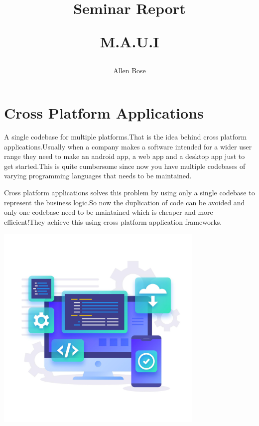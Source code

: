 \documentclass[14pt]{extarticle}
\title{
     \huge Seminar Report \par
     \Huge M.A.U.I
}
\author{
    Allen Bose
}
\begin{document}
\maketitle
{}

\newpage
\tableofcontents
\newpage
{}
\section{
  Cross Platform Applications
 }
\parbox{\linewidth}{
    \setlength{\parskip}{1em}

    A single codebase for multiple platforms.That is the idea behind cross platform applications.Usually when a company makes a software intended for a wider user range they need to make an android app, a web app and a desktop app just to get started.This is quite cumbersome since now you have multiple codebases of varying programming languages that needs to be maintained.
}

\parbox{\linewidth}{
    \setlength{\parskip}{1em}

    Cross platform applications solves this problem by using only a single codebase to represent the business logic.So now the duplication of code can be avoided and only one codebase need to be maintained which is cheaper and more efficient!They achieve this using cross platform application frameworks.
}

\begin{center}
    \includegraphics[width=100mm,height=100mm,keepaspectratio]{cross-platform-app.jpg}
\end{center}
\end{document}
